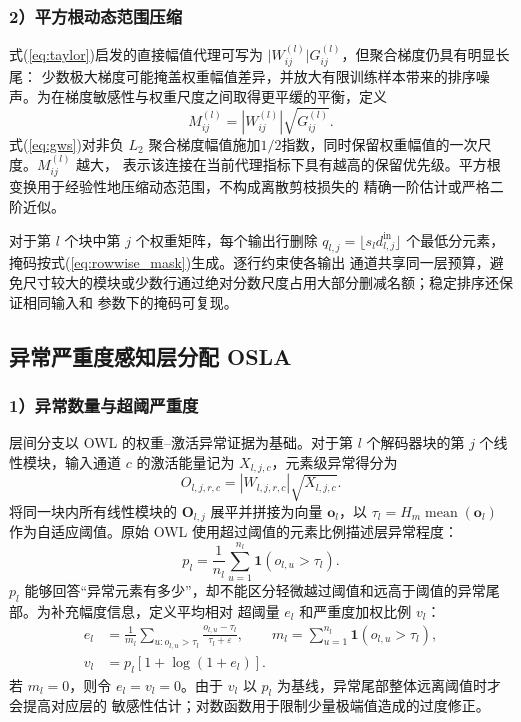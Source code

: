 \documentclass[UTF8,fontset=fandol]{ctexart}
\begin{document}
\subsubsection*{2）平方根动态范围压缩}

式(\ref{eq:taylor})启发的直接幅值代理可写为 $\lvert W_{ij}^{(l)}\rvert G_{ij}^{(l)}$，但聚合梯度仍具有明显长尾：
少数极大梯度可能掩盖权重幅值差异，并放大有限训练样本带来的排序噪声。为在梯度敏感性与权重尺度之间取得更平缓的平衡，定义
\begin{equation}
M_{ij}^{(l)}
=
\left|W_{ij}^{(l)}\right|
\sqrt{G_{ij}^{(l)}}.
\label{eq:gws}
\end{equation}
式(\ref{eq:gws})对非负 $L_2$ 聚合梯度幅值施加$1/2$指数，同时保留权重幅值的一次尺度。$M_{ij}^{(l)}$ 越大，
表示该连接在当前代理指标下具有越高的保留优先级。平方根变换用于经验性地压缩动态范围，不构成离散剪枝损失的
精确一阶估计或严格二阶近似。

对于第 $l$ 个块中第 $j$ 个权重矩阵，每个输出行删除
$q_{l,j}=\lfloor s_l d_{l,j}^{\mathrm{in}}\rfloor$ 个最低分元素，掩码按式(\ref{eq:rowwise_mask})生成。逐行约束使各输出
通道共享同一层预算，避免尺寸较大的模块或少数行通过绝对分数尺度占用大部分删减名额；稳定排序还保证相同输入和
参数下的掩码可复现。

\subsection{异常严重度感知层分配 OSLA}

\subsubsection*{1）异常数量与超阈严重度}

层间分支以 OWL\cite{owl} 的权重--激活异常证据为基础。对于第 $l$ 个解码器块的第 $j$ 个线性模块，输入通道
$c$ 的激活能量记为 $X_{l,j,c}$，元素级异常得分为
\begin{equation}
O_{l,j,r,c}
=
\left|W_{l,j,r,c}\right|\sqrt{X_{l,j,c}} .
\label{eq:outlier}
\end{equation}
将同一块内所有线性模块的 $\bm O_{l,j}$ 展平并拼接为向量 $\bm o_l$，以
$\tau_l=H_m\operatorname{mean}(\bm o_l)$ 作为自适应阈值。原始 OWL 使用超过阈值的元素比例描述层异常程度：
\begin{equation}
p_l
=
\frac{1}{n_l}
\sum_{u=1}^{n_l}\mathbf 1(o_{l,u}>\tau_l).
\label{eq:count}
\end{equation}
$p_l$ 能够回答“异常元素有多少”，却不能区分轻微越过阈值和远高于阈值的异常尾部。为补充幅度信息，定义平均相对
超阈量 $e_l$ 和严重度加权比例 $v_l$：
\begin{equation}
\begin{aligned}
e_l&=
\frac{1}{m_l}
\sum_{u:o_{l,u}>\tau_l}
\frac{o_{l,u}-\tau_l}{\tau_l+\varepsilon},
\qquad
m_l=\sum_{u=1}^{n_l}\mathbf 1(o_{l,u}>\tau_l),\\
v_l&=p_l\left[1+\log(1+e_l)\right].
\end{aligned}
\label{eq:severity}
\end{equation}
若 $m_l=0$，则令 $e_l=v_l=0$。由于 $v_l$ 以 $p_l$ 为基线，异常尾部整体远离阈值时才会提高对应层的
敏感性估计；对数函数用于限制少量极端值造成的过度修正。
\end{document}
